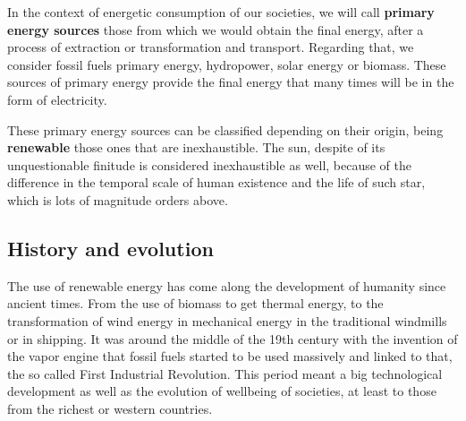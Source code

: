 
In the context of energetic consumption of our societies, we will call \textbf{primary energy sources} those from which we would obtain the final energy, after a process of extraction or transformation and transport. Regarding that, we consider fossil fuels primary energy, hydropower, solar energy or biomass. These sources of primary energy provide the final energy that many times will be in the form of electricity. 

These primary energy sources can be classified depending on their origin, being \textbf{renewable} those ones that are inexhaustible. The sun, despite of its unquestionable finitude is considered inexhaustible as well, because of the difference in the temporal scale of  human existence and the life of such star, which is lots of magnitude orders above.

\subsection{History and evolution}


The use of renewable energy has come along the development of humanity since ancient times. From the use of biomass to get thermal energy, to the transformation of wind energy in mechanical energy in the traditional windmills or in shipping. It was around the middle of the 19th century with the invention of the vapor engine that fossil fuels started to be used massively and linked to that, the so called First Industrial Revolution. This period meant a big technological development as well as the evolution of wellbeing of societies, at least to those from the richest or western countries.


